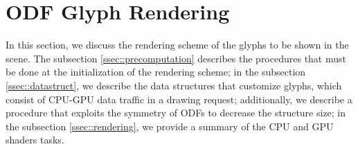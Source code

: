\documentclass[twoside,twocolumn,10pt]{article}
\begin{document}














\section{ODF Glyph Rendering}
\label{sec::odf_glyph_rendering}

In this section, we discuss the rendering scheme of the glyphs to be shown in the scene. The subsection \ref{ssec::precomputation} describes the procedures that must be done at the initialization of the rendering scheme; in the subsection \ref{ssec::datastruct}, we describe the data structures that customize glyphs, which consist of CPU-GPU data traffic in a drawing request; additionally, we describe a procedure that exploits the symmetry of ODFs to decrease the structure size; in the subsection \ref{ssec::rendering}, we provide a summary of the CPU and GPU shaders tasks.




\end{document}
